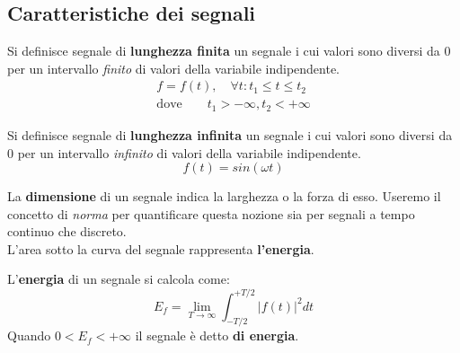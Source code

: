 \documentclass[a4paper, titlepage]{article}
\begin{document}
\begin{center}
\end{center}

\subsection{Caratteristiche dei segnali}
Si definisce segnale di \textbf{lunghezza finita} un segnale i cui valori sono diversi da $0$ per un intervallo \textit{finito} di valori della variabile indipendente.
\begin{align*}
	f=f(t), \quad \forall t:t_{1} \leq t \leq t_{2}\\
	\text{dove} \qquad t_{1} > -\infty, t_{2} < +\infty
\end{align*}

Si definisce segnale di \textbf{lunghezza infinita} un segnale i cui valori sono diversi da $0$ per un intervallo \textit{infinito} di valori della variabile indipendente.
$$
	f(t)=sin(\omega t)
$$

La \textbf{dimensione} di un segnale indica la larghezza o la forza di esso. Useremo il concetto di \textit{norma} per quantificare questa nozione sia per segnali a tempo continuo che discreto.\\
L'area sotto la curva del segnale rappresenta \textbf{l'energia}.

\begin{center}
\end{center}

L'\textbf{energia} di un segnale si calcola come:
$$
	E_{f} = \lim_{T\rightarrow\infty} \int_{-T/2}^{+T/2}|f(t)|^2dt
$$
Quando $0<E_{f}<+\infty$ il segnale è detto \textbf{di energia}.
\end{document}
